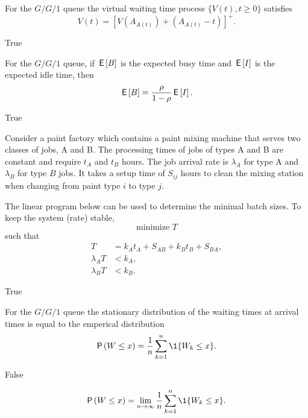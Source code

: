 \begin{exercise}[201704]%
For the $G/G/1$ queue the virtual waiting time process $\{V(t), t\geq 0\}$ 
satisfies
      \begin{equation*}
        V(t) = [V(A_{A(t)}) + (A_{A(t)}-t)]^+.
      \end{equation*}
    \begin{solution} True
    \end{solution}
\end{exercise}

\begin{exercise}[201704]%
  For the $G/G/1$ queue, if $\,\mathsf{E}\left[B\right]$ is the expected busy time and
  $\,\mathsf{E}\left[I\right]$ is the expected idle time, then
\begin{equation*}
  \,\mathsf{E}\left[B\right] = \frac{\rho }{1-\rho} \,\mathsf{E}\left[I\right]. 
\end{equation*}
\begin{solution} True
\end{solution}
\end{exercise}

\begin{exercise}[201704]%
  Consider a paint factory which contains a paint mixing machine that
  serves two classes of jobs, A and B. The processing times of jobs of
  types A and B are constant and require $t_A$ and $t_B$ hours. The
  job arrival rate is $\lambda_A$ for type A and $\lambda_B$ for type
  $B$ jobs. It takes a setup time of $S_{i j}$ hours to clean the mixing
  station when changing from paint type $i$ to type $j$.

  The linear program below can be used to determine the minimal batch
  sizes.  To keep the system (rate) stable,
\begin{equation*}
  \text{minimize }  T
\end{equation*}
such that
\begin{align*}
 T&=  k_A t_A + S_{AB} + k_B t_B + S_{BA}, \\
 \lambda_A T &< k_A,  \\
 \lambda_B T &< k_B.
\end{align*}

  \begin{solution} True
  \end{solution}
\end{exercise}

\begin{exercise}[201704]%
  For the $G/G/1$ queue the stationary distribution  of
  the waiting times at arrival times is equal to the emperical distribution
\begin{equation*}
  \P{W \leq x}  =  \frac 1n\sum_{k=1}^n \1{W_k\leq x}.
\end{equation*}
\begin{solution} False
  
\begin{equation}
  \P{W \leq x}  = \lim_{n\to\infty} \frac 1n\sum_{k=1}^n \1{W_k\leq x}.
\end{equation}

\end{solution}
\end{exercise}



